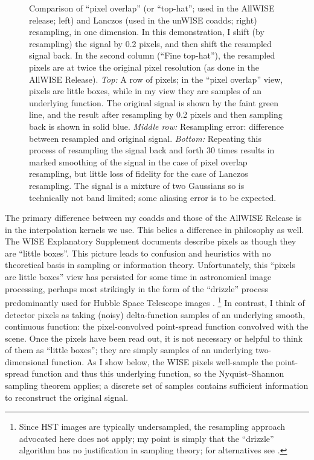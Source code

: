 \documentclass[11pt,preprint]{aastex}
\begin{document}
\begin{figure}
\begin{center}
\begin{tabular}{@{}c@{}c@{}c@{}c@{}}
\end{tabular}
\end{center}
\caption{\small Comparison of ``pixel overlap'' (or ``top-hat''; used
  in the AllWISE release; left) and Lanczos (used in the unWISE
  coadds; right) resampling, in one dimension.  In this demonstration,
  I shift (by resampling) the signal by 0.2 pixels, and then shift
  the resampled signal back.  In the second column (``Fine top-hat''),
  the resampled pixels are at twice the original pixel resolution (as
  done in the AllWISE Release).  \emph{Top:} A row of pixels; in the
  ``pixel overlap'' view, pixels are little boxes, while in my view
  they are samples of an underlying function.  The original signal is
  shown by the faint green line, and the result after resampling by
  0.2 pixels and then sampling back is shown in solid blue.
  \emph{Middle row:} Resampling error: difference between resampled
  and original signal. \emph{Bottom:} Repeating this process of
  resampling the signal back and forth 30 times results in marked
  smoothing of the signal in the case of pixel overlap resampling, but
  little loss of fidelity for the case of Lanczos resampling.
  The signal is a mixture of two Gaussians so is technically not
  band limited; some aliasing error is to be expected.
  \label{fig:boxes}}
\end{figure}



The primary difference between my coadds and those of the AllWISE
Release is in the interpolation kernels we use.  This belies a
difference in philosophy as well.  The WISE Explanatory Supplement
documents describe pixels as though they are ``little boxes''.  This
picture leads to confusion and heuristics with no theoretical basis in
sampling or information theory.  Unfortunately, this ``pixels are
little boxes'' view has persisted for some time in astronomical image
processing, perhaps most strikingly in the form of the ``drizzle''
process predominantly used for Hubble Space Telescope images
\citep{drizzle}.%
\footnote{Since HST images are typically undersampled, the resampling
  approach advocated here does not apply; my point is simply that
  the ``drizzle'' algorithm has no justification in sampling theory;
  for alternatives see \cite{lauer, rowe, mahmoudian}.}  In contrast,
I think of detector pixels as taking (noisy) delta-function samples
of an underlying smooth, continuous function: the pixel-convolved
point-spread function convolved with the scene.  Once the pixels have
been read out, it is not necessary or helpful to think of them as
``little boxes''; they are simply samples of an underlying
two-dimensional function.  As I show below, the WISE pixels
well-sample the point-spread function and thus this underlying
function, so the Nyquist--Shannon sampling theorem applies; a discrete
set of samples contains sufficient information to reconstruct the
original signal.
\end{document}
